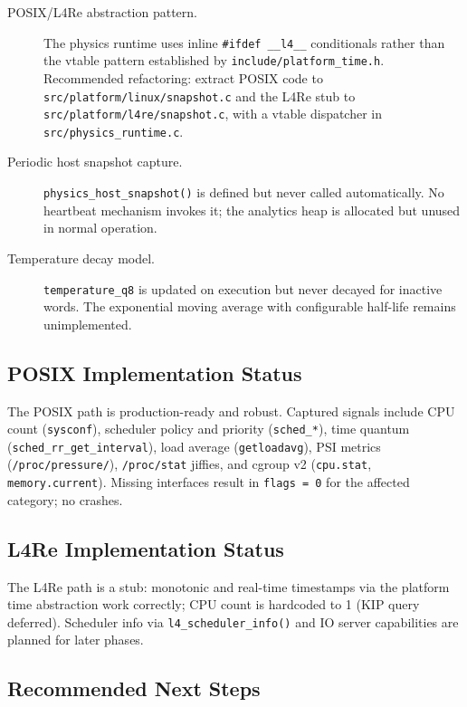 \begin{description}
  \item[POSIX/L4Re abstraction pattern.]
        The physics runtime uses inline \texttt{\#ifdef \_\_l4\_\_}
        conditionals rather than the vtable pattern established by
        \texttt{include/platform\_time.h}. Recommended refactoring: extract
        POSIX code to \texttt{src/platform/linux/snapshot.c} and the L4Re
        stub to \texttt{src/platform/l4re/snapshot.c}, with a vtable
        dispatcher in \texttt{src/physics\_runtime.c}.

  \item[Periodic host snapshot capture.]
        \texttt{physics\_host\_snapshot()} is defined but never called
        automatically. No heartbeat mechanism invokes it; the analytics heap
        is allocated but unused in normal operation.

  \item[Temperature decay model.]
        \texttt{temperature\_q8} is updated on execution but never decayed
        for inactive words. The exponential moving average with configurable
        half-life remains unimplemented.
\end{description}

\subsection{POSIX Implementation Status}

The POSIX path is production-ready and robust. Captured signals include CPU
count (\texttt{sysconf}), scheduler policy and priority (\texttt{sched\_*}),
time quantum (\texttt{sched\_rr\_get\_interval}), load average
(\texttt{getloadavg}), PSI metrics (\texttt{/proc/pressure/}), \texttt{/proc/stat}
jiffies, and cgroup v2 (\texttt{cpu.stat}, \texttt{memory.current}).
Missing interfaces result in \texttt{flags = 0} for the affected category;
no crashes.

\subsection{L4Re Implementation Status}

The L4Re path is a stub: monotonic and real-time timestamps via the platform
time abstraction work correctly; CPU count is hardcoded to 1 (KIP query
deferred). Scheduler info via \texttt{l4\_scheduler\_info()} and IO server
capabilities are planned for later phases.

\subsection{Recommended Next Steps}

